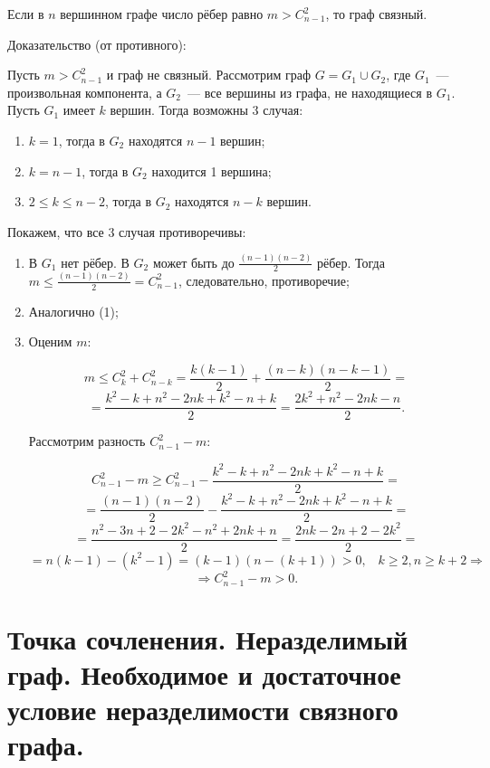 Если в $n$ вершинном графе число рёбер равно $m > C^2_{n - 1}$, то граф
связный.
\bigskip

Доказательство (от противного):
\bigskip

Пусть $m > C^2_{n - 1}$ и граф не связный. Рассмотрим граф $G = G_1 \cup G_2$,
где $G_1$~--- произвольная компонента, а $G_2$~--- все вершины из графа,
не находящиеся в $G_1$. Пусть $G_1$ имеет $k$ вершин. Тогда возможны 3 случая:

\begin{enumerate}
    \item{$k = 1$, тогда в $G_2$ находятся $n - 1$ вершин;}
    \item{$k = n - 1$, тогда в $G_2$ находится 1 вершина;}
    \item{$2 \leq  k \leq n - 2$, тогда в $G_2$ находятся $n - k$ вершин.}
\end{enumerate}
\smallskip

Покажем, что все 3 случая противоречивы:
\smallskip

\begin{enumerate}
    \item{В $G_1$ нет рёбер. В $G_2$ может быть до $\frac{(n - 1)(n - 2)}{2}$
    рёбер. Тогда $m \leq \frac{(n - 1)(n - 2)}{2} = C^2_{n - 1}$, следовательно,
    противоречие;}
    \item{Аналогично (1);}
    \item{Оценим $m$:
    \bigskip
    
    \[
        m \leq C^2_k + C^2_{n - k} = \frac{k (k - 1)}{2} + \frac{(n - k)(n - k - 1)}{2}
        = 
    \]
    \[   
        =
        \frac{k^2 - k + n^2 - 2nk + k^2 - n + k}{2} = \frac{2k^2 + n^2 - 2nk - n}{2}.  
    \]
    \smallskip
    
    Рассмотрим разность $C^2_{n - 1} - m$:
    \bigskip
    
    \[
        C^2_{n - 1} - m \geq C^2_{n - 1} - \frac{k^2 - k + n^2 - 2nk + k^2 - n + k}{2} = 
    \]
    \[
        = \frac{(n - 1)(n - 2)}{2} - \frac{k^2 - k + n^2 - 2nk + k^2 - n + k}{2} =
    \]  
    \[
        = \frac{n^2 - 3n + 2 - 2k^2 - n^2 + 2nk + n}{2} = \frac{2nk - 2n + 2 - 2k^2}{2} =  
    \]
    \[
        = n(k - 1) - (k^2 - 1) = (k - 1)(n - (k + 1)) > 0, \;\;\; k \geq 2, n \geq k + 2
        \Rightarrow     
    \]
    \[
        \Rightarrow C^2_{n - 1} - m > 0.  
    \]}
\end{enumerate}

\section{Точка сочленения. Неразделимый граф. Необходимое и достаточное условие
неразделимости связного графа.}

